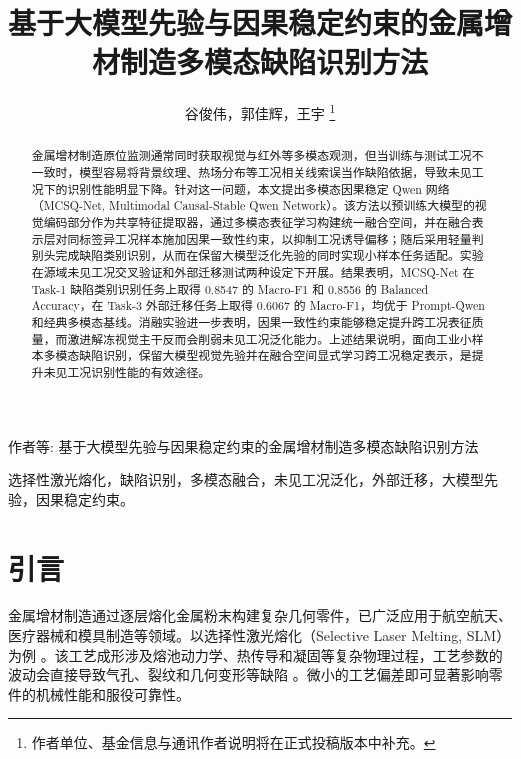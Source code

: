 \documentclass[journal]{IEEEtran}
\begin{document}
\title{基于大模型先验与因果稳定约束的金属增材制造多模态缺陷识别方法}

\author{谷俊伟，郭佳辉，王宇
\thanks{作者单位、基金信息与通讯作者说明将在正式投稿版本中补充。}}

%
{作者等: 基于大模型先验与因果稳定约束的金属增材制造多模态缺陷识别方法}

\maketitle

\begin{abstract}
金属增材制造原位监测通常同时获取视觉与红外等多模态观测，但当训练与测试工况不一致时，模型容易将背景纹理、热场分布等工况相关线索误当作缺陷依据，导致未见工况下的识别性能明显下降。针对这一问题，本文提出多模态因果稳定 Qwen 网络（MCSQ-Net, Multimodal Causal-Stable Qwen Network）。该方法以预训练大模型的视觉编码部分作为共享特征提取器，通过多模态表征学习构建统一融合空间，并在融合表示层对同标签异工况样本施加因果一致性约束，以抑制工况诱导偏移；随后采用轻量判别头完成缺陷类别识别，从而在保留大模型泛化先验的同时实现小样本任务适配。实验在源域未见工况交叉验证和外部迁移测试两种设定下开展。结果表明，MCSQ-Net 在 Task-1 缺陷类别识别任务上取得 0.8547 的 Macro-F1 和 0.8556 的 Balanced Accuracy，在 Task-3 外部迁移任务上取得 0.6067 的 Macro-F1，均优于 Prompt-Qwen 和经典多模态基线。消融实验进一步表明，因果一致性约束能够稳定提升跨工况表征质量，而激进解冻视觉主干反而会削弱未见工况泛化能力。上述结果说明，面向工业小样本多模态缺陷识别，保留大模型视觉先验并在融合空间显式学习跨工况稳定表示，是提升未见工况识别性能的有效途径。
\end{abstract}

\begin{IEEEkeywords}
选择性激光熔化，缺陷识别，多模态融合，未见工况泛化，外部迁移，大模型先验，因果稳定约束。
\end{IEEEkeywords}

\section{引言}
金属增材制造通过逐层熔化金属粉末构建复杂几何零件，已广泛应用于航空航天、医疗器械和模具制造等领域。以选择性激光熔化（Selective Laser Melting, SLM）为例 \cite{ref_defect_formation_slm}。该工艺成形涉及熔池动力学、热传导和凝固等复杂物理过程，工艺参数的波动会直接导致气孔、裂纹和几何变形等缺陷 \cite{ref_in_situ_monitoring_review}。微小的工艺偏差即可显著影响零件的机械性能和服役可靠性。
\end{document}
